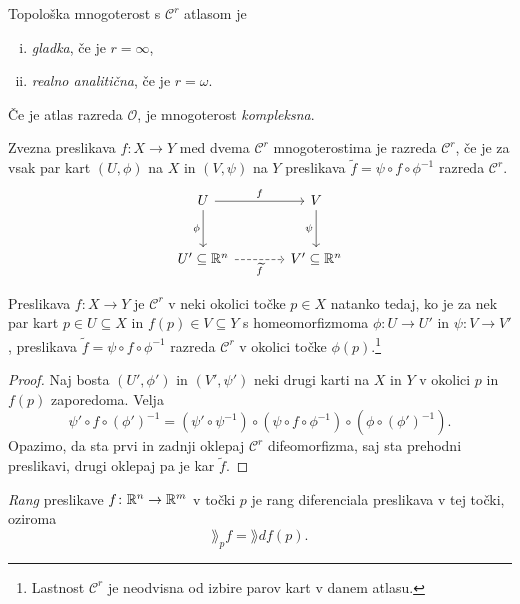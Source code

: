 \begin{definicija}
Topološka mnogoterost s $\mathcal{C}^r$ atlasom je

\begin{enumerate}[i)]
\item \emph{gladka}, če je $r = \infty$,
\item \emph{realno analitična}, če je $r = \omega$.
\end{enumerate}

Če je atlas razreda $\mathcal{O}$, je mnogoterost
\emph{kompleksna}.
\end{definicija}

\begin{definicija}
Zvezna preslikava $f \colon X \to Y$ med dvema $\mathcal{C}^r$
mnogoterostima je razreda $\mathcal{C}^r$, če je za vsak par kart
$(U, \phi)$ na $X$ in $(V, \psi)$ na $Y$ preslikava
$\widetilde{f} = \psi \circ f \circ \phi^{-1}$ razreda
$\mathcal{C}^r$.
\[
\begin{tikzcd}[column sep=large, row sep=large]
U \arrow[r, "f"] \arrow[d, "\phi"'] & V \arrow[d, "\psi"'] \\
U' \subseteq \R^n \arrow[r, dashrightarrow, "\widetilde{f}"'] &
V' \subseteq \R^n
\end{tikzcd}
\]
\end{definicija}


\begin{trditev}
Preslikava $f \colon X \to Y$ je $\mathcal{C}^r$ v neki okolici
točke $p \in X$ natanko tedaj, ko je za nek par kart
$p \in U \subseteq X$ in $f(p) \in V \subseteq Y$ s homeomorfizmoma
$\phi \colon U \to U'$ in $\psi \colon V \to V'$, preslikava
$\widetilde{f} = \psi \circ f \circ \phi^{-1}$ razreda
$\mathcal{C}^r$ v okolici točke $\phi(p)$.\footnote{Lastnost
$\mathcal{C}^r$ je neodvisna od izbire parov kart v danem atlasu.}
\end{trditev}

\begin{proof}
Naj bosta $(U', \phi')$ in $(V', \psi')$ neki drugi karti na $X$ in
$Y$ v okolici $p$ in $f(p)$ zaporedoma. Velja
\[
\psi' \circ f \circ (\phi')^{-1} =
(\psi' \circ \psi^{-1}) \circ (\psi \circ
f \circ \phi^{-1}) \circ (\phi \circ (\phi')^{-1}).
\]
Opazimo, da sta prvi in zadnji oklepaj $\mathcal{C}^r$
difeomorfizma, saj sta prehodni preslikavi, drugi oklepaj pa je kar
$\widetilde{f}$.
\end{proof}

\begin{definicija}
\emph{Rang} preslikave
$f \colon \mathbb{R}^n \to \mathbb{R}^m$ v točki $p$ je rang diferenciala
preslikava v tej točki, oziroma
\[
\rang_p f = \rang df(p).
\]
\end{definicija}

